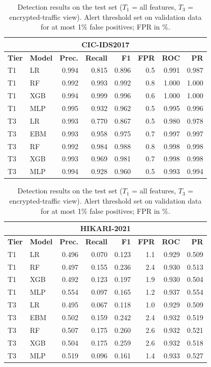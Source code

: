 \begin{table}[!htbp]
\centering
\caption{Detection results on the test set ($T_1$ = all features, $T_3$ = encrypted-traffic view). Alert threshold set on validation data for at most 1\% false positives; FPR in \%.}
\label{tab:det}
\scriptsize
\setlength{\tabcolsep}{2.5pt}
\begin{minipage}[t]{0.495\textwidth}
\centering
\begin{tabular}{llrrrrrr}
\toprule
\multicolumn{8}{c}{\textbf{CIC-IDS2017}} \\
\midrule
\textbf{Tier} & \textbf{Model} & \textbf{Prec.} & \textbf{Recall} & \textbf{F1} & \textbf{FPR} & \textbf{ROC} & \textbf{PR} \\
\midrule
T1 & LR & 0.994 & 0.815 & 0.896 & 0.5 & 0.991 & 0.987 \\
T1 & RF & 0.992 & 0.993 & 0.992 & 0.8 & 1.000 & 1.000 \\
T1 & XGB & 0.994 & 0.999 & 0.996 & 0.6 & 1.000 & 1.000 \\
T1 & MLP & 0.995 & 0.932 & 0.962 & 0.5 & 0.995 & 0.996 \\
\midrule
T3 & LR & 0.993 & 0.770 & 0.867 & 0.5 & 0.980 & 0.978 \\
T3 & EBM & 0.993 & 0.958 & 0.975 & 0.7 & 0.997 & 0.997 \\
T3 & RF & 0.992 & 0.984 & 0.988 & 0.8 & 0.998 & 0.998 \\
T3 & XGB & 0.993 & 0.969 & 0.981 & 0.7 & 0.998 & 0.998 \\
T3 & MLP & 0.994 & 0.928 & 0.960 & 0.5 & 0.993 & 0.994 \\
\bottomrule
\end{tabular}
\end{minipage}
\hfill
\begin{minipage}[t]{0.495\textwidth}
\centering
\begin{tabular}{llrrrrrr}
\toprule
\multicolumn{8}{c}{\textbf{HIKARI-2021}} \\
\midrule
\textbf{Tier} & \textbf{Model} & \textbf{Prec.} & \textbf{Recall} & \textbf{F1} & \textbf{FPR} & \textbf{ROC} & \textbf{PR} \\
\midrule
T1 & LR & 0.496 & 0.070 & 0.123 & 1.1 & 0.929 & 0.509 \\
T1 & RF & 0.497 & 0.155 & 0.236 & 2.4 & 0.930 & 0.513 \\
T1 & XGB & 0.492 & 0.123 & 0.197 & 1.9 & 0.930 & 0.504 \\
T1 & MLP & 0.554 & 0.097 & 0.165 & 1.2 & 0.937 & 0.554 \\
\midrule
T3 & LR & 0.495 & 0.067 & 0.118 & 1.0 & 0.929 & 0.509 \\
T3 & EBM & 0.502 & 0.159 & 0.242 & 2.4 & 0.932 & 0.519 \\
T3 & RF & 0.507 & 0.175 & 0.260 & 2.6 & 0.932 & 0.521 \\
T3 & XGB & 0.504 & 0.175 & 0.259 & 2.6 & 0.932 & 0.518 \\
T3 & MLP & 0.519 & 0.096 & 0.161 & 1.4 & 0.933 & 0.527 \\
\bottomrule
\end{tabular}
\end{minipage}
\end{table}
